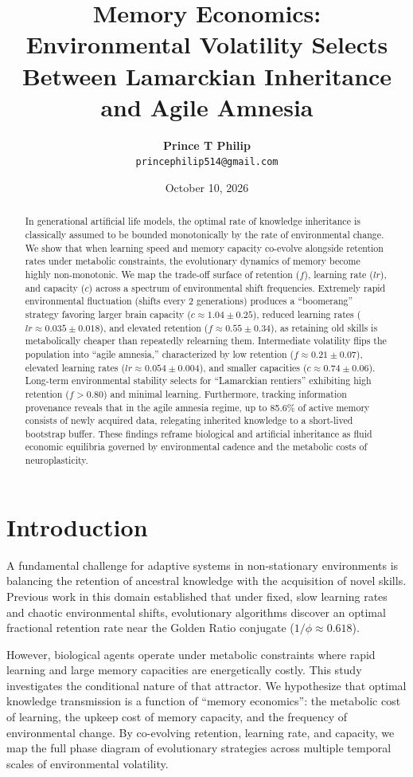 \documentclass[11pt,a4paper]{article}
\title{\textbf{Memory Economics: Environmental Volatility Selects Between Lamarckian Inheritance and Agile Amnesia}}
\author{\textbf{Prince T Philip} \\ \texttt{princephilip514@gmail.com}}
\date{October 10, 2026}
\begin{document}
\maketitle

\begin{abstract}
In generational artificial life models, the optimal rate of knowledge inheritance is classically assumed to be bounded monotonically by the rate of environmental change. We show that when learning speed and memory capacity co-evolve alongside retention rates under metabolic constraints, the evolutionary dynamics of memory become highly non-monotonic. We map the trade-off surface of retention ($f$), learning rate ($lr$), and capacity ($c$) across a spectrum of environmental shift frequencies. Extremely rapid environmental fluctuation (shifts every 2 generations) produces a ``boomerang'' strategy favoring larger brain capacity ($c \approx 1.04 \pm 0.25$), reduced learning rates ($lr \approx 0.035 \pm 0.018$), and elevated retention ($f \approx 0.55 \pm 0.34$), as retaining old skills is metabolically cheaper than repeatedly relearning them. Intermediate volatility flips the population into ``agile amnesia,'' characterized by low retention ($f \approx 0.21 \pm 0.07$), elevated learning rates ($lr \approx 0.054 \pm 0.004$), and smaller capacities ($c \approx 0.74 \pm 0.06$). Long-term environmental stability selects for ``Lamarckian rentiers'' exhibiting high retention ($f > 0.80$) and minimal learning. Furthermore, tracking information provenance reveals that in the agile amnesia regime, up to 85.6\% of active memory consists of newly acquired data, relegating inherited knowledge to a short-lived bootstrap buffer. These findings reframe biological and artificial inheritance as fluid economic equilibria governed by environmental cadence and the metabolic costs of neuroplasticity.
\end{abstract}

\section{Introduction}
A fundamental challenge for adaptive systems in non-stationary environments is balancing the retention of ancestral knowledge with the acquisition of novel skills. Previous work in this domain established that under fixed, slow learning rates and chaotic environmental shifts, evolutionary algorithms discover an optimal fractional retention rate near the Golden Ratio conjugate ($1/\phi \approx 0.618$).

However, biological agents operate under metabolic constraints where rapid learning and large memory capacities are energetically costly. This study investigates the conditional nature of that attractor. We hypothesize that optimal knowledge transmission is a function of ``memory economics'': the metabolic cost of learning, the upkeep cost of memory capacity, and the frequency of environmental change. By co-evolving retention, learning rate, and capacity, we map the full phase diagram of evolutionary strategies across multiple temporal scales of environmental volatility.
\end{document}
